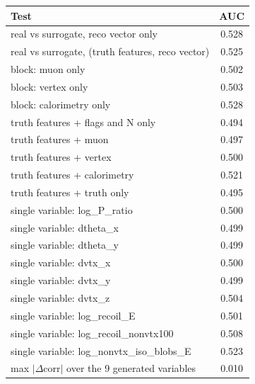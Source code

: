 \begin{tabular}{lc}
\toprule
Test & AUC \\
\midrule
real vs surrogate, reco vector only & 0.528 \\
real vs surrogate, (truth features, reco vector) & 0.525 \\
\midrule
block: muon only & 0.502 \\
block: vertex only & 0.503 \\
block: calorimetry only & 0.528 \\
truth features + flags and N only & 0.494 \\
truth features + muon & 0.497 \\
truth features + vertex & 0.500 \\
truth features + calorimetry & 0.521 \\
truth features + truth only & 0.495 \\
single variable: log\_P\_ratio & 0.500 \\
single variable: dtheta\_x & 0.499 \\
single variable: dtheta\_y & 0.499 \\
single variable: dvtx\_x & 0.500 \\
single variable: dvtx\_y & 0.499 \\
single variable: dvtx\_z & 0.504 \\
single variable: log\_recoil\_E & 0.501 \\
single variable: log\_recoil\_nonvtx100 & 0.508 \\
single variable: log\_nonvtx\_iso\_blobs\_E & 0.523 \\
\midrule
max $|\Delta$corr$|$ over the 9 generated variables & 0.010 \\
\bottomrule
\end{tabular}
